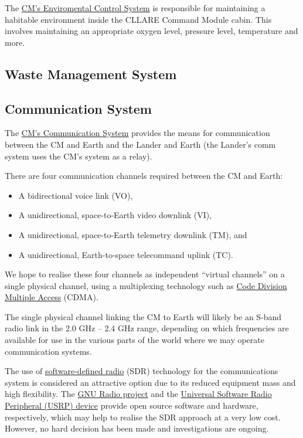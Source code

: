 \documentclass{report}
\begin{document}
The \href{http://cstart.org/wiki/CLLARE_Environmental_Control_System}{CM's Enviromental Control System} is responsible for maintaining a habitable environment inside the CLLARE Command Module cabin. This involves maintaining an appropriate oxygen level, pressure level, temperature and more.

\subsection{Waste Management System}

\subsection{Communication System}

The \href{http://cstart.org/wiki/CLLARE_CM_Communication_System}{CM's Communication System} provides the means for communication between the CM and Earth and the Lander and Earth (the Lander's comm system uses the CM's system as a relay).

There are four communication channels required between the CM and Earth:
\begin{itemize}
\item A bidirectional voice link (VO),
\item A unidirectional, space-to-Earth video downlink (VI),
\item A unidirectional, space-to-Earth telemetry downlink (TM), and
\item A unidirectional, Earth-to-space telecommand uplink (TC).
\end{itemize}
We hope to realise these four channels as independent ``virtual channels'' on a single physical channel, using a multiplexing technology such as \href{http://en.wikipedia.org/wiki/Code_division_multiple_access}{Code Division Multiple Access} (CDMA).

The single physical channel linking the CM to Earth will likely be an S-band radio link in the 2.0 GHz -- 2.4 GHz range, depending on which frequencies are available for use in the various parts of the world where we may operate communication systems.

The use of \href{http://en.wikipedia.org/wiki/Software_defined_radio}{software-defined radio} (SDR) technology for the communications system is considered an attractive option due to its reduced equipment mass and high flexibility.  The \href{http://gnuradio.org/redmine/wiki/gnuradio}{GNU Radio project} and the \href{http://www.ettus.com/products}{Universal Software Radio Peripheral (USRP) device} provide open source software and hardware, respectively, which may help to realise the SDR approach at a very low cost.  However, no hard decision has been made and investigations are ongoing.
\end{document}
